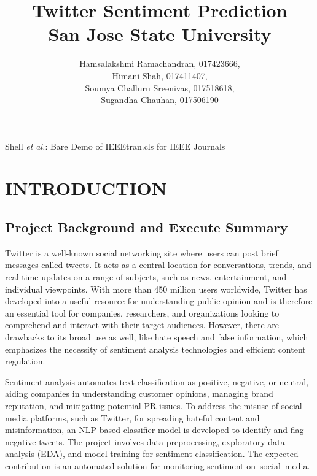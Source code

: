 \documentclass[journal]{IEEEtran}
\begin{document}
\title{Twitter Sentiment Prediction\\
\large San Jose State University}

\author{
Hamsalakshmi Ramachandran, 017423666,\\
Himani Shah, 017411407,\\
Soumya Challuru Sreenivas, 017518618,\\
Sugandha Chauhan, 017506190
}
       
{Shell \MakeLowercase{\textit{et al.}}: Bare Demo of IEEEtran.cls for IEEE Journals}

\maketitle

\section{ INTRODUCTION}

\subsection{ \textbf{Project Background and Execute Summary}}
Twitter is a well-known social networking site where users can post brief messages called tweets. It acts as a central location for conversations, trends, and real-time updates on a range of subjects, such as news, entertainment, and individual viewpoints. With more than 450 million users worldwide, Twitter has developed into a useful resource for understanding public opinion and is therefore an essential tool for companies, researchers, and organizations looking to comprehend and interact with their target audiences. However, there are drawbacks to its broad use as well, like hate speech and false information, which emphasizes the necessity of sentiment analysis technologies and efficient content regulation.

Sentiment analysis automates text classification as positive, negative, or neutral, aiding companies in understanding customer opinions, managing brand reputation, and mitigating potential PR issues. To address the misuse of social media platforms, such as Twitter, for spreading hateful content and misinformation, an NLP-based classifier model is developed to identify and flag negative tweets. The project involves data preprocessing, exploratory data analysis (EDA), and model training for sentiment classification. The expected contribution is an automated solution for monitoring sentiment on social media.
\end{document}

